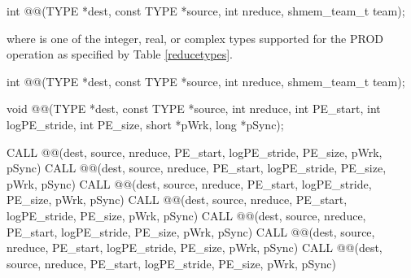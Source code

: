 \begin{apidefinition}
{\color{Green}
\begin{C11synopsis}
int @@(TYPE *dest, const TYPE *source, int nreduce, shmem_team_t team);
\end{C11synopsis}
where \TYPE{} is one of the integer, real, or complex types supported for the PROD operation as specified by Table \ref{reducetypes}.
}

\begin{Csynopsis}
\end{Csynopsis}
{\color{Green}
\begin{CsynopsisCol}
int @@(TYPE *dest, const TYPE *source, int nreduce, shmem_team_t team);
\end{CsynopsisCol}
}
\begin{DeprecateBlock}
\begin{CsynopsisCol}
void @@(TYPE *dest, const TYPE *source, int nreduce, int PE_start, int logPE_stride, int PE_size, short *pWrk, long *pSync);
\end{CsynopsisCol}
\end{DeprecateBlock}

\begin{Fsynopsis}
CALL @@(dest, source, nreduce, PE_start, logPE_stride, PE_size, pWrk, pSync)
CALL @@(dest, source, nreduce, PE_start, logPE_stride, PE_size, pWrk, pSync)
CALL @@(dest, source, nreduce, PE_start, logPE_stride, PE_size, pWrk, pSync)
CALL @@(dest, source, nreduce, PE_start, logPE_stride, PE_size, pWrk, pSync)
CALL @@(dest, source, nreduce, PE_start, logPE_stride, PE_size, pWrk, pSync)
CALL @@(dest, source, nreduce, PE_start, logPE_stride, PE_size, pWrk, pSync)
CALL @@(dest, source, nreduce, PE_start, logPE_stride, PE_size, pWrk, pSync)
\end{Fsynopsis}



\begin{apiarguments}



\end{apiarguments}
\end{apidefinition}
